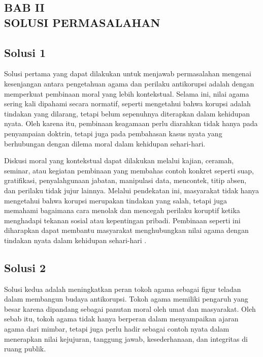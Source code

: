 \newpage

\renewcommand\thesection{2}
\renewcommand\thesubsection{\arabic{subsection}}

\setcounter{subsection}{0}

\begin{center}
    \section*{\textbf{BAB II \\ SOLUSI PERMASALAHAN}}
\end{center}

\subsection{Solusi 1}
    Solusi pertama yang dapat dilakukan untuk menjawab permasalahan mengenai kesenjangan antara pengetahuan agama dan perilaku antikorupsi adalah dengan memperkuat pembinaan moral yang lebih kontekstual. Selama ini, nilai agama sering kali dipahami secara normatif, seperti mengetahui bahwa korupsi adalah tindakan yang dilarang, tetapi belum sepenuhnya diterapkan dalam kehidupan nyata. Oleh karena itu, pembinaan keagamaan perlu diarahkan tidak hanya pada penyampaian doktrin, tetapi juga pada pembahasan kasus nyata yang berhubungan dengan dilema moral dalam kehidupan sehari-hari.

    Diskusi moral yang kontekstual dapat dilakukan melalui kajian, ceramah, seminar, atau kegiatan pembinaan yang membahas contoh konkret seperti suap, gratifikasi, penyalahgunaan jabatan, manipulasi data, mencontek, titip absen, dan perilaku tidak jujur lainnya. Melalui pendekatan ini, masyarakat tidak hanya mengetahui bahwa korupsi merupakan tindakan yang salah, tetapi juga memahami bagaimana cara menolak dan mencegah perilaku koruptif ketika menghadapi tekanan sosial atau kepentingan pribadi. Pembinaan seperti ini diharapkan dapat membantu masyarakat menghubungkan nilai agama dengan tindakan nyata dalam kehidupan sehari-hari \citep{hasan2024,nuruddin2024}.


\subsection{Solusi 2}  
     Solusi kedua adalah meningkatkan peran tokoh agama sebagai figur teladan dalam membangun budaya antikorupsi. Tokoh agama memiliki pengaruh yang besar karena dipandang sebagai panutan moral oleh umat dan masyarakat. Oleh sebab itu, tokoh agama tidak hanya berperan dalam menyampaikan ajaran agama dari mimbar, tetapi juga perlu hadir sebagai contoh nyata dalam menerapkan nilai kejujuran, tanggung jawab, kesederhanaan, dan integritas di ruang publik.

